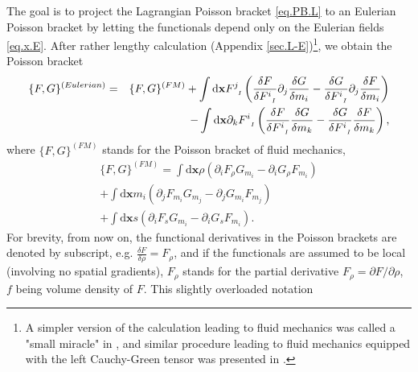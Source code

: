 \documentclass[
10pt, %
a4paper, %
oneside, %
headinclude,footinclude, %
BCOR5mm, %
]{scrartcl}
\newcommand{\xx}{\mathbf{x}}
\newcommand{\dx}{\mathrm{d}\xx}
\newcommand{\IP}[1]{{\color{Red}IP:\ \ #1}}
\newcommand{\VK}[1]{{\color{Cyan}VK:\ \ #1}}
\newcommand{\pd}{\partial}
\newcommand{\F}[2]{F^{#1}_{\ \, \mathsmaller#2}}
\newcommand{\Ffunc}{F}
\newcommand{\Gfunc}{G}
\newcommand{\Hfunc}{H}
\begin{document}
The goal is to project the Lagrangian Poisson bracket \eqref{eq.PB.L} to an Eulerian Poisson bracket by letting the functionals depend only on the Eulerian fields \eqref{eq.x.E}. After rather lengthy calculation (Appendix \ref{sec.L-E})\footnote{A simpler version of the calculation leading to fluid mechanics was called a "small miracle" in \cite{Abarbanel}, and similar procedure leading to fluid mechanics equipped with the left Cauchy-Green tensor was presented in \cite{BE}.}, we obtain the Poisson bracket
\begin{eqnarray}\label{eq.PB.Eu}
	\{\Ffunc,\Gfunc\}^{(Eulerian)} &=& \{\Ffunc,\Gfunc\}^{(FM)} + \int\dx 
	\F{j}{I} 
	\left(\frac{\delta \Ffunc}{\delta 
	\F{i}{I}} \partial_j \frac{\delta \Gfunc}{\delta m_i}-\frac{\delta 
	\Gfunc}{\delta \F{i}{I}} \partial_j 
	\frac{\delta \Ffunc}{\delta m_i}\right)\nonumber\\
	&&-\int\dx \partial_k \F{i}{I} \left(\frac{\delta \Ffunc}{\delta \F{i}{I}} 
	\frac{\delta \Gfunc}{\delta 
	m_k}-\frac{\delta \Gfunc}{\delta \F{i}{I}} \frac{\delta \Ffunc}{\delta 
	m_k}\right),
\end{eqnarray}
where 
$\{\Ffunc,G\}^{(FM)}$ stands for the Poisson bracket of fluid mechanics,
\begin{multline}\label{eq.PB.FM}
	\{\Ffunc,\Gfunc\}^{(FM)} = \int\dx \rho (\partial_i \Ffunc_\rho 
	\Gfunc_{m_i}-\partial_i \Gfunc_\rho \Ffunc_{m_i})\\
	+ \int\dx m_i (\partial_j \Ffunc_{m_i} \Gfunc_{m_j}-\partial_j \Gfunc_{m_i} 
	\Ffunc_{m_j})\\
	+ \int\dx s (\partial_i \Ffunc_s \Gfunc_{m_i}-\partial_i \Gfunc_s 
	\Ffunc_{m_i}).
\end{multline}
For brevity, from now on, the functional derivatives in the Poisson brackets 
are denoted by subscript, e.g. $\frac{\delta \Ffunc}{\delta \rho} = 
\Ffunc_\rho$, 
and if the functionals are assumed to be local (involving no spatial 
gradients), $\Ffunc_\rho$ stands for the partial derivative $\Ffunc_\rho = \pd 
\Ffunc/\pd 
\rho$, $f$ being volume density of $\Ffunc$. This slightly overloaded notation 
\end{document}
